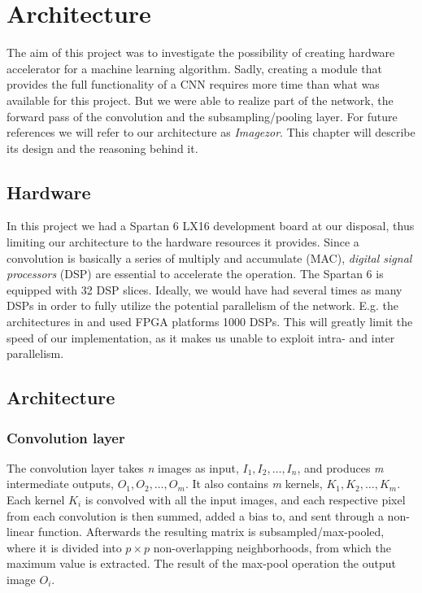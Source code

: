 \chapter{Architecture} \label{method_results}

The aim of this project was to investigate the possibility of creating hardware accelerator for a machine learning algorithm. Sadly, creating a module that provides the full functionality of a CNN requires more time than what was available for this project. But we were able to realize part of the network, the forward pass of the convolution and the subsampling/pooling layer. For future references we will refer to our architecture as \textit{Imagezor}. This chapter will describe its design and the reasoning behind it. 


\section{Hardware}

In this project we had a Spartan 6 LX16 development board at our disposal, thus limiting our architecture to the hardware resources it provides. Since a convolution is basically a series of multiply and accumulate (MAC), \textit{digital signal processors} (DSP) are essential to accelerate the operation. The Spartan 6 is equipped with 32 DSP slices. Ideally, we would have had several times as many DSPs in order to fully utilize the potential parallelism of the network. E.g. the architectures in \cite{Farabet2009} \cite{Farabet2010} \cite{Chakradhar2010} and \cite{Paper} used FPGA platforms 1000 DSPs. This will greatly limit the speed of our implementation, as it makes us unable to exploit intra- and inter parallelism. 

\section{Architecture}


\subsection {Convolution layer}

The convolution layer takes \textit{n} images as input, $ I_1, I_2, \dots, I_n $, and produces \textit{m} intermediate outputs, $O_1, O_2, \dots, O_m $. It also contains \textit{m} kernels, $ K_1, K_2, \dots, K_m $. Each kernel $ K_i $ is convolved with all the input images, and each respective pixel from each convolution is then summed, added a bias to, and sent through a non-linear function. Afterwards the resulting matrix is subsampled/max-pooled, where it is divided into $ p \times p $ non-overlapping neighborhoods, from which the maximum value is extracted. The result of the max-pool operation the output image $ O_i $. 
 


